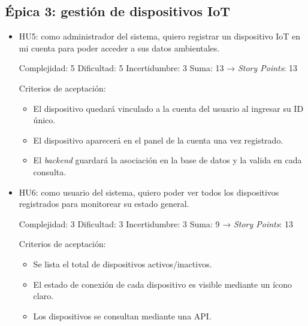 \documentclass[
11pt, %
]{charter}
\begin{document}
\subsection*{Épica 3: gestión de dispositivos IoT}
\begin{itemize}
	\item HU5: como administrador del sistema, quiero registrar un dispositivo IoT en mi cuenta para poder acceder a sus datos ambientales.

	Complejidad: 5
	Dificultad: 5
	Incertidumbre: 3
	Suma: 13 → \textit{Story Points}: 13

	Criterios de aceptación:
	\begin{itemize}
		\item El dispositivo quedará vinculado a la cuenta del usuario al ingresar su ID único.
		\item El dispositivo aparecerá en el panel de la cuenta una vez registrado.
		\item El \textit{backend} guardará la asociación en la base de datos y la valida en cada consulta.
	\end{itemize}
	\item HU6: como usuario del sistema, quiero poder ver todos los dispositivos registrados para monitorear su estado general.

	Complejidad: 3
	Dificultad: 3
	Incertidumbre: 3
	Suma: 9 → \textit{Story Points}: 13

	Criterios de aceptación:
	\begin{itemize}
		\item Se lista el total de dispositivos activos/inactivos.
		\item El estado de conexión de cada dispositivo es visible mediante un ícono claro.
		\item Los dispositivos se consultan mediante una API.
	\end{itemize}
\end{itemize}
\end{document}
